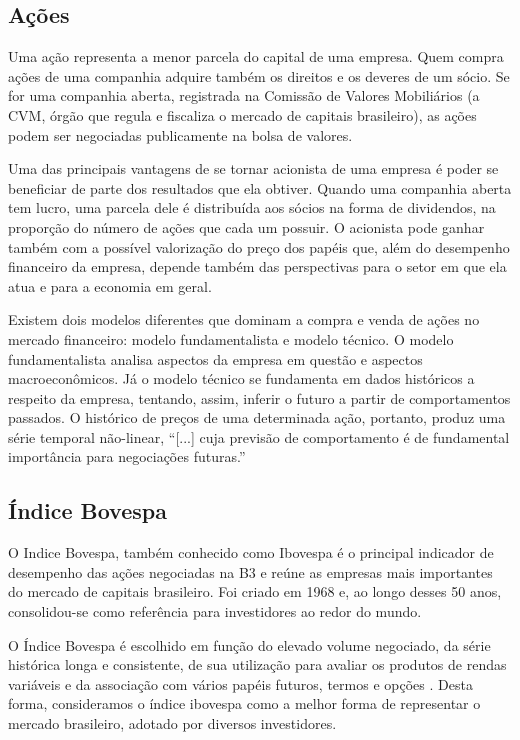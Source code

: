 \subsection{Ações}

Uma ação representa a menor parcela do capital de uma empresa. Quem compra ações de uma companhia adquire também os direitos e os deveres de um sócio. Se for uma companhia aberta, registrada na Comissão de Valores Mobiliários (a CVM, órgão que regula e fiscaliza o mercado de capitais brasileiro), as ações podem ser negociadas publicamente na bolsa de valores. \cite{InfoMoney}

Uma das principais vantagens de se tornar acionista de uma empresa é poder se beneficiar de parte dos resultados que ela obtiver. Quando uma companhia aberta tem lucro, uma parcela dele é distribuída aos sócios na forma de dividendos, na proporção do número de ações que cada um possuir. O acionista pode ganhar também com a possível valorização do preço dos papéis que, além do desempenho financeiro da empresa, depende também das perspectivas para o setor em que ela atua e para a economia em geral. \cite{InfoMoney}

Existem dois modelos diferentes que dominam a compra e venda de ações no mercado financeiro: modelo fundamentalista e modelo técnico. O modelo fundamentalista analisa aspectos da empresa em questão e aspectos macroeconômicos. Já o modelo técnico se fundamenta em dados históricos a respeito da empresa, tentando, assim, inferir o futuro a partir de comportamentos passados.\cite{acoes} O histórico de preços de uma determinada ação, portanto, produz uma série temporal não-linear, “[...] cuja previsão de comportamento é de fundamental importância para negociações futuras.” \cite{silva}



\subsection{Índice Bovespa}

O Indice Bovespa, também conhecido como Ibovespa é o principal indicador de desempenho das ações negociadas na B3 e reúne as empresas mais importantes do mercado de capitais brasileiro. Foi criado em 1968 e, ao longo desses 50 anos, consolidou-se como referência para investidores ao redor do mundo.\cite{b3}

O Índice Bovespa é escolhido em função do elevado volume negociado, da série histórica longa e consistente, de sua utilização para avaliar os produtos de rendas variáveis e da
associação com vários papéis futuros, termos e opções
\cite{indice_bovespa}. Desta forma, consideramos o índice ibovespa como a melhor forma de representar o mercado brasileiro, adotado por diversos investidores.

